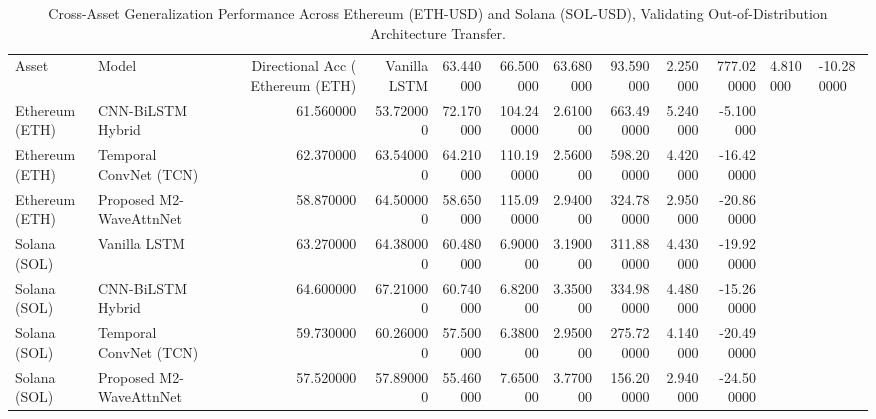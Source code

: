 \begin{table}
\caption{Cross-Asset Generalization Performance Across Ethereum (ETH-USD) and Solana (SOL-USD), Validating Out-of-Distribution Architecture Transfer.}
\label{tab:cross_asset}
\begin{tabular}{llrrrrrrrr}
\toprule
Asset & Model & Directional Acc (%
\midrule
Ethereum (ETH) & Vanilla LSTM & 63.440000 & 66.500000 & 63.680000 & 93.590000 & 2.250000 & 777.020000 & 4.810000 & -10.280000 \\
Ethereum (ETH) & CNN-BiLSTM Hybrid & 61.560000 & 53.720000 & 72.170000 & 104.240000 & 2.610000 & 663.490000 & 5.240000 & -5.100000 \\
Ethereum (ETH) & Temporal ConvNet (TCN) & 62.370000 & 63.540000 & 64.210000 & 110.190000 & 2.560000 & 598.200000 & 4.420000 & -16.420000 \\
Ethereum (ETH) & Proposed M2-WaveAttnNet & 58.870000 & 64.500000 & 58.650000 & 115.090000 & 2.940000 & 324.780000 & 2.950000 & -20.860000 \\
Solana (SOL) & Vanilla LSTM & 63.270000 & 64.380000 & 60.480000 & 6.900000 & 3.190000 & 311.880000 & 4.430000 & -19.920000 \\
Solana (SOL) & CNN-BiLSTM Hybrid & 64.600000 & 67.210000 & 60.740000 & 6.820000 & 3.350000 & 334.980000 & 4.480000 & -15.260000 \\
Solana (SOL) & Temporal ConvNet (TCN) & 59.730000 & 60.260000 & 57.500000 & 6.380000 & 2.950000 & 275.720000 & 4.140000 & -20.490000 \\
Solana (SOL) & Proposed M2-WaveAttnNet & 57.520000 & 57.890000 & 55.460000 & 7.650000 & 3.770000 & 156.200000 & 2.940000 & -24.500000 \\
\bottomrule
\end{tabular}
\end{table}

